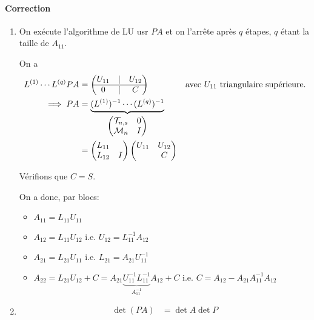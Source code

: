 \documentclass{article}
\begin{document}
\paragraph{Correction}

\begin{enumerate}
    \item On exécute l'algorithme de LU usr $PA$ et on l'arrête après $q$ étapes, $q$ étant la taille de $A_{11}$.

        On a 
        \begin{align*}
            L^{(1)}\cdots L^{(q)} PA &= \begin{pmatrix} U_{11} & | & U_{12} \\ \hline 0 & | & C \end{pmatrix} \quad&\text{avec $U_{11}$ triangulaire supérieure.} \\
            \implies PA &= \underbrace{(L^{(1)})^{-1} \cdots (L^{(q)})^{-1}}_{\begin{pmatrix} \mathcal{T}_{n, s} & 0 \\ \mathcal{M}_{n} & I \end{pmatrix} } \\
                        &= \begin{pmatrix} L_{11} & \\ L_{12} & I \end{pmatrix} \begin{pmatrix} U_{11} & U_{12} \\ & C \end{pmatrix}  \\
        \end{align*}

        Vérifions que $C=S$.


        On a donc, par blocs:

        \begin{itemize}
            \item $A_{11} = L_{11} U_{11}$ 
            \item $A_{12}= L_{11} U_{12}$ i.e. $U_{12} = L_{11}^{-1} A_{12}$
            \item $A_{21} = L_{21} U_{11}$ i.e. $L_{21} = A_{21} U_{11}^{-1}$
            \item $A_{22} = L_{21} U_{12} + C = A_{21} \underbrace{U_{11}^{-1} L_{11}^{-1}}_{A_{11}^{-1}} A_{12} + C$ i.e. $C = A_{12} - A_{21} A_{11}^{-1} A_{12}$
        \end{itemize}
    \item \begin{align*}
        \det(PA) &= \det A \det P \\
    \end{align*}


\end{enumerate}
\end{document}
